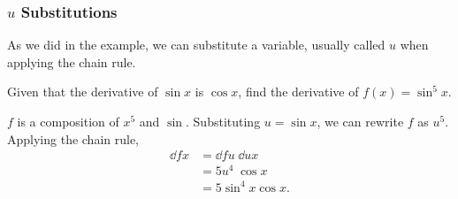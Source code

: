 \subsubsection{$u$ Substitutions}
As we did in the example, we can substitute a variable, usually called $u$ when applying the chain rule.
\begin{example}
	Given that the derivative of $\sin{x}$ is $\cos{x}$, find the derivative of $f(x)=\sin^5{x}$.
\end{example}
\begin{answer}
	$f$ is a composition of $x^5$ and $\sin$.
	Substituting $u=\sin{x}$, we can rewrite $f$ as $u^5$.
	Applying the chain rule,
	\begin{align*}
		\dd{f}{x} &= \dd{f}{u} \hspace{3pt} \dd{u}{x} \\
		&= 5u^4 \hspace{3pt} \cos{x} \\
		&= 5\sin^4{x}\cos{x}.
	\end{align*}
\end{answer}